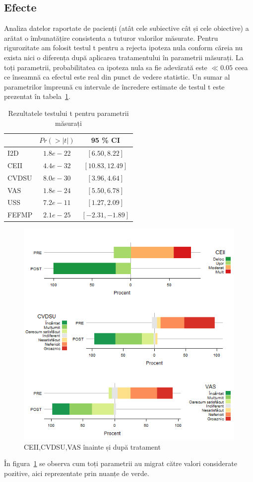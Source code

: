 \documentclass[12pt]{article}
\begin{document}
\subsection{Efecte}
  Analiza datelor raportate de pacienți (atât cele subiective cât și cele obiective) a arătat o îmbunatățire consistenta a tuturor valorilor măsurate. Pentru rigurozitate am folosit testul t pentru a rejecta ipoteza nula conform căreia nu exista nici o diferența după aplicarea tratamentului în parametrii măsurați. La toți parametrii, probabilitatea ca ipoteza nula sa fie adevărată este $\ll 0.05$ ceea ce înseamnă ca efectul este real din punct de vedere statistic. Un sumar al parametrilor împreună cu intervale de încredere estimate de testul t este prezentat în tabela~\ref{tab:resTestSummary}.
  \begin{table}[H]
    \centering
    \begin{tabular}{|l|c|c|}
      \hline
       & $Pr(>|t|)$ & 95 \% CI \\   \hline
      I2D & 		$1.8e-22$ 	& $[ 6.50, 8.22 ]$ \\ \hline
      CEII & 		$4.4e-32$ 	& $[ 10.83, 12.49 ]$ \\ \hline
      CVDSU & $8.0e-30$ 	& $[ 3.96, 4.64 ]$ \\ \hline
      VAS & 		$1.8e-24$ 	& $[ 5.50, 6.78 ]$ \\ \hline
      USS & 		$7.2e-11$ 	& $[ 1.27, 2.09 ]$ \\ \hline
      FEFMP & $2.1e-25$ 	& $[ -2.31, -1.89 ]$ \\ \hline
    \end{tabular}
    \caption{Rezultatele testului t pentru parametrii măsurați} 
    \label{tab:resTestSummary}
  \end{table}
  \begin{figure}[H]
    \centering
    \includegraphics[width=0.8\linewidth]{incoResVariousStack}
    \caption{\ac{CEII},\ac{CVDSU},\ac{VAS} înainte și după tratament}
    \label{fig:incoResVariousStack}
  \end{figure}
  În figura~\ref{fig:incoResVariousStack} se observa cum toți parametrii au migrat către valori considerate pozitive, aici reprezentate prin nuanțe de verde. 
  
\end{document}
